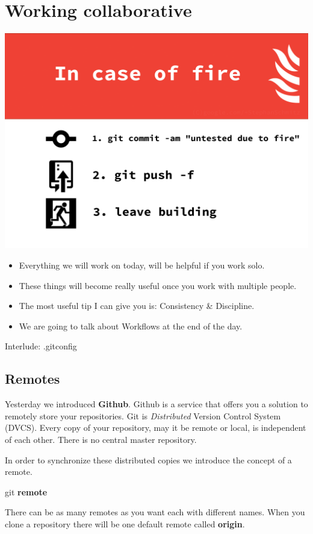 \documentclass{beamer}
\begin{document}

\section{Working collaborative}
\begin{frame}[fragile]
  \centering
  \includegraphics[width=0.7\linewidth]{Incaseoffire}
  \begin{itemize}
    \item Everything we will work on today, will be helpful if you work solo.
    \item These things will become really useful once you work with multiple people.
    \item The most useful tip I can give you is: \pause Consistency \& Discipline.
    \item We are going to talk about Workflows at the end of the day.
  \end{itemize}
\end{frame}
\begin{frame}{Interlude: .gitconfig}
\end{frame}
\subsection{Remotes}
\begin{frame}[fragile]
  Yesterday we introduced \textbf{Github}. Github is a service that offers you a solution to remotely store your repositories. 
  Git is \emph{Distributed} Version Control System (DVCS). Every copy of your repository, may it be remote or local, is independent of each other. There is no central master repository. 

  In order to synchronize these distributed copies we introduce the concept of a remote.
\pause
  \begin{block}{}
    git \textbf{remote}
  \end{block}
\pause
  There can be as many remotes as you want each with different names. When you clone a repository there will be one default remote called \textbf{origin}.
\end{frame}
\end{document}
